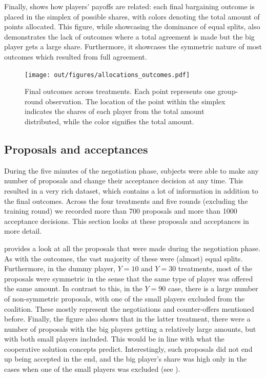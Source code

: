 \documentclass[12pt]{article}
\begin{document}
Finally,  shows how players' payoffs are related: each final bargaining outcome is placed in the simplex of possible shares, with colors denoting the total amount of points allocated. This figure, while showcasing the dominance of equal splits, also demonstrates the lack of outcomes where a total agreement is made but the big player gets a large share. Furthermore, it showcases the symmetric nature of most outcomes which resulted from full agreement.

\begin{figure}
    \centering
    \texttt{[image: out/figures/allocations\_outcomes.pdf]}
    \caption{Final outcomes across treatments. Each point represents one group-round observation. The location of the point within the simplex indicates the shares of each player from the total amount distributed, while the color signifies the total amount.}
    \label{fig:allocations_outcomes}
\end{figure}


\subsection{Proposals and acceptances}

During the five minutes of the negotiation phase, subjects were able to make any number of proposals and change their acceptance decision at any time. This resulted in a very rich dataset, which contains a lot of information in addition to the final outcomes. Across the four treatments and five rounds (excluding the training round) we recorded more than 700 proposals and more than 1000 acceptance decisions. This section looks at these proposals and acceptances in more detail.

 provides a look at all the proposals that were made during the negotiation phase. As with the outcomes, the vast majority of these were (almost) equal splits. Furthermore, in the dummy player, $Y=10$ and $Y=30$ treatments, most of the proposals were symmetric in the sense that the same type of player was offered the same amount. In contrast to this, in the $Y=90$ case, there is a large number of non-symmetric proposals, with one of the small players excluded from the coalition. These mostly represent the negotiations and counter-offers mentioned before. Finally, the figure also shows that in the latter treatment, there were a number of proposals with the big players getting a relatively large amounts, but with both small players included. This would be in line with what the cooperative solution concepts predict. Interestingly, such proposals did not end up being accepted in the end, and the big player's share was high only in the cases when one of the small players was excluded (see ).
\end{document}
